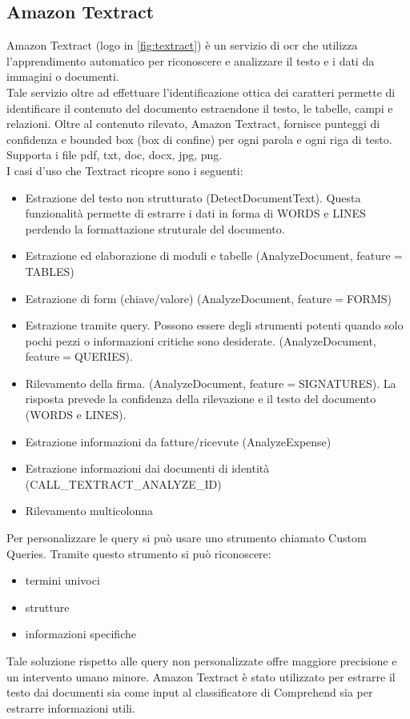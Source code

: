 \subsection{Amazon Textract}
Amazon Textract (logo in \ref{fig:textract}) è un servizio di \gls{ocr} che utilizza l'apprendimento automatico per riconoscere e analizzare il testo e i dati da immagini o documenti. \\
Tale servizio oltre ad effettuare l'identificazione ottica dei caratteri permette di identificare il contenuto del documento estraendone il testo, le tabelle, campi e relazioni. Oltre al contenuto rilevato, Amazon Textract, fornisce punteggi di confidenza e bounded box (box di confine) per ogni parola e ogni riga di testo.
Supporta i file pdf, txt, doc, docx, jpg, png.\\
I casi d'uso che Textract ricopre sono i seguenti:
\begin{itemize}
  \item Estrazione del testo non strutturato (DetectDocumentText). Questa funzionalità permette di estrarre i dati in forma di WORDS e LINES perdendo la formattazione struturale del documento. 
  \item Estrazione ed elaborazione di moduli e tabelle (AnalyzeDocument, feature$=$TABLES)
  \item Estrazione di form (chiave/valore) (AnalyzeDocument, feature$=$FORMS)
  \item Estrazione tramite query. Possono essere degli strumenti potenti quando solo pochi pezzi o informazioni critiche sono desiderate. (AnalyzeDocument, feature$=$QUERIES). 
  \item Rilevamento della firma. (AnalyzeDocument, feature$=$SIGNATURES). La risposta prevede la confidenza della rilevazione e il testo del documento (WORDS e LINES). 
  \item Estrazione informazioni da fatture/ricevute (AnalyzeExpense)
  \item Estrazione informazioni dai documenti di identità (CALL\_TEXTRACT\_ANALYZE\_ID)
  \item Rilevamento multicolonna
\end{itemize}
Per personalizzare le query si può usare uno strumento chiamato Custom Queries. Tramite questo strumento si può riconoscere:
\begin{itemize}
  \item termini univoci
  \item strutture
  \item informazioni specifiche
\end{itemize}
Tale soluzione rispetto alle query non personalizzate offre maggiore precisione e un intervento umano minore. 
Amazon Textract è stato utilizzato per estrarre il testo dai documenti sia come input al classificatore di Comprehend sia per estrarre informazioni utili.


